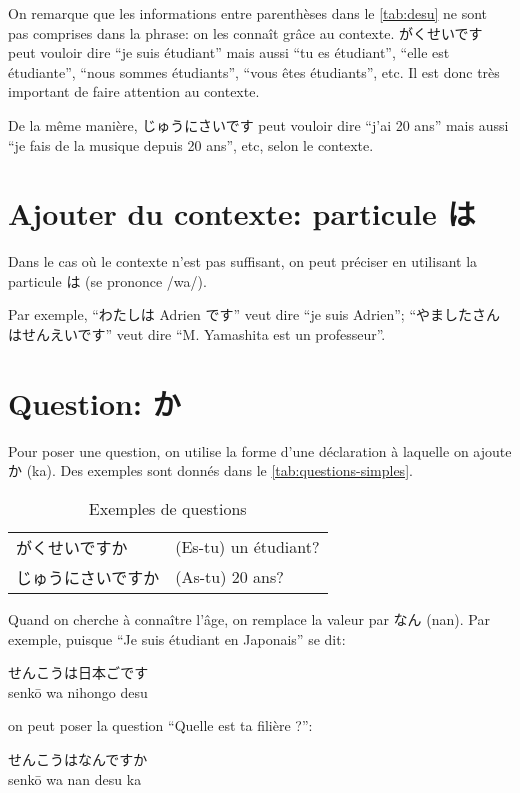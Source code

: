 \documentclass[a4paper,10pt,french,openany]{memoir}
\begin{document}
On remarque que les informations entre parenthèses dans le \autoref{tab:desu} ne sont pas comprises dans la phrase: on les connaît grâce au contexte. がくせいです peut vouloir dire ``je suis étudiant'' mais aussi ``tu es étudiant'', ``elle est étudiante'', ``nous sommes étudiants'', ``vous êtes étudiants'', etc. Il est donc très important de faire attention au contexte.

De la même manière, じゅうにさいです peut vouloir dire ``j'ai 20 ans'' mais aussi ``je fais de la musique depuis 20 ans'', etc, selon le contexte.

\section{Ajouter du contexte: particule は}
Dans le cas où le contexte n'est pas suffisant, on peut préciser en utilisant la particule は (se prononce /wa/).

Par exemple, ``わたしは Adrien です'' veut dire ``je suis Adrien''; ``やましたさんはせんえいです'' veut dire ``M. Yamashita est un professeur''.

\section{Question: か}
Pour poser une question, on utilise la forme d'une déclaration à laquelle on ajoute か (ka). Des exemples sont donnés dans le \autoref{tab:questions-simples}.

\begin{table}[htbp]
 \centering
 \begin{tabular}{ll}
  がくせいですか & (Es-tu) un étudiant? \\
  じゅうにさいですか & (As-tu) 20 ans?
 \end{tabular}
 \caption{Exemples de questions}
 \label{tab:questions-simples}
\end{table}

Quand on cherche à connaître l'âge, on remplace la valeur par なん (nan). Par exemple, puisque ``Je suis étudiant en Japonais'' se dit:
\begin{center}
 せんこうは日本ごです\\
 senkō wa nihongo desu
\end{center}
on peut poser la question ``Quelle est ta filière ?'':
\begin{center}
 せんこうはなんですか\\
 senkō wa nan desu ka
\end{center}
\end{document}
